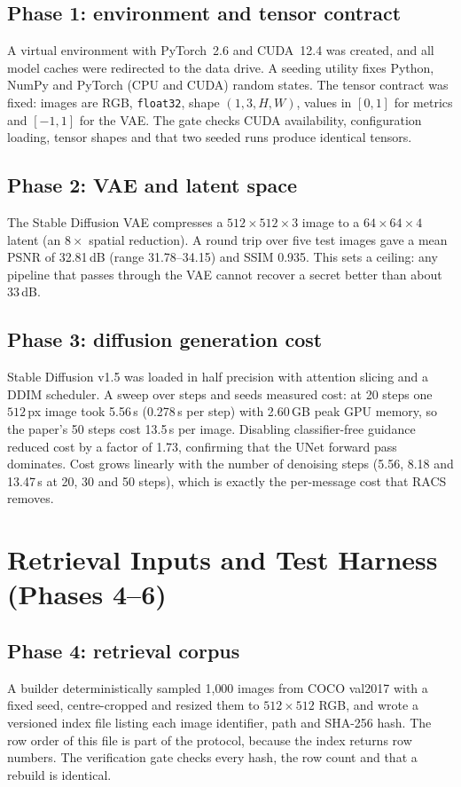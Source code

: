 \subsection{Phase 1: environment and tensor contract}
A virtual environment with PyTorch~2.6 and CUDA~12.4 was created, and all model caches were
redirected to the data drive. A seeding utility fixes Python, NumPy and PyTorch (CPU and CUDA)
random states. The tensor contract was fixed: images are RGB, \texttt{float32}, shape
$(1,3,H,W)$, values in $[0,1]$ for metrics and $[-1,1]$ for the VAE. The gate checks CUDA
availability, configuration loading, tensor shapes and that two seeded runs produce identical
tensors.

\subsection{Phase 2: VAE and latent space}
The Stable Diffusion VAE compresses a $512\times512\times3$ image to a $64\times64\times4$ latent
(an $8\times$ spatial reduction). A round trip over five test images gave a mean PSNR of
32.81\,dB (range 31.78--34.15) and SSIM 0.935. This sets a ceiling: any pipeline that passes
through the VAE cannot recover a secret better than about 33\,dB.


\subsection{Phase 3: diffusion generation cost}
Stable Diffusion v1.5 was loaded in half precision with attention slicing and a DDIM scheduler.
A sweep over steps and seeds measured cost: at 20 steps one $512$\,px image took 5.56\,s
(0.278\,s per step) with 2.60\,GB peak GPU memory, so the paper's 50 steps cost 13.5\,s per
image. Disabling classifier-free guidance reduced cost by a factor of 1.73, confirming that the
UNet forward pass dominates. Cost grows linearly with the number of denoising steps (5.56,
8.18 and 13.47\,s at 20, 30 and 50 steps), which is exactly the per-message cost that RACS removes.

\section{Retrieval Inputs and Test Harness (Phases 4--6)}
\subsection{Phase 4: retrieval corpus}
A builder deterministically sampled 1{,}000 images from COCO val2017 with a fixed seed,
centre-cropped and resized them to $512\times512$ RGB, and wrote a versioned index file listing
each image identifier, path and SHA-256 hash. The row order of this file is part of the protocol,
because the index returns row numbers. The verification gate checks every hash, the row count
and that a rebuild is identical.


